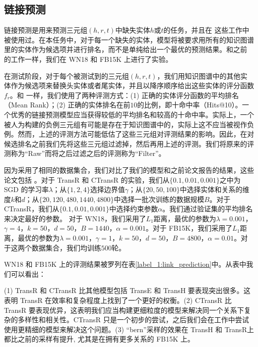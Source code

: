     \subsection{链接预测}
    链接预测是用来预测三元组$(h, r, t)$中缺失实体$h$或$t$的任务，并且在 \cite{bordes2011learning,bordes2012joint,bordes2013translating} 这些工作中被使用过。在本任务中，对于每一个缺失的实体，模型将被要求用所有的知识图谱里的实体作为候选项并进行排名，而不是单纯给出一个最优的预测结果。和之前 \cite{bordes2011learning,bordes2013translating} 的工作一样，我们在 WN18 和 FB15K 上进行了实验。

    在测试阶段，对于每个被测试到的三元组$(h, r, t)$，我们用知识图谱中的其他实体作为候选项来替换头实体或者尾实体，并且以降序顺序给出这些实体的评分函数$f_r$。和 \cite{bordes2013translating} 一样，我们使用了两种评测方式：(1) 正确的实体评分函数的平均排名（Mean Rank）；(2) 正确的实体排名在前$10$的比例，即十命中率（Hits@10）。一个优秀的链接预测模型应当获得较低的平均排名和较高的十命中率。实际上，一个被人为构建的负例三元组有可能是存在于知识图谱中的，实际上这不应当被视作负例。然而，上述的评测方法可能低估了这些三元组对评测结果的影响。因此，在对候选排名之前我们先将这些三元组过滤掉，然后再用上述的评测。我们将原来的评测称为``Raw''而将之后过滤之后的评测称为``Filter''。

    因为采用了相同的数据集合，我们对比了我们的模型和之前论文报告的结果，这些论文包括 \cite{bordes2013translating,wang2014knowledge}。对于 TransR 和 CTransR 的实验，我们从$\{0.1, 0.01, 0.001\}$之中为 SGD 的学习率$\lambda$；从$\{1, 2, 4\}$选择边界值$\gamma$；从$\{20,50,100\}$中选择实体和关系的维度$k$和$d$；从$\{20, 120, 480, 1440, 4800\}$中选择一批次训练的数据规模$B$。对于 CTransR，我们从$\{0.1,0.01,0.001\}$中选择约束参数$\alpha$。我们通过验证集的平均排名来决定最好的参数。
    对于 WN18，我们采用了$L_1$距离，最优的参数为$\lambda = 0.001$，$\gamma= 4$，$k = 50$，$d = 50$，$B = 1440$，$\alpha=0.001$。对于 FB15K，我们采用了$L_1$距离，最优的参数为$\lambda = 0.001$，$\gamma = 1$，$k = 50$，$d = 50$，$B = 4800$，$\alpha=0.01$。对于这两个数据集合，我们均训练$500$轮。

    WN18 和 FB15K 上的评测结果被罗列在表\ref{label_1:link_prediction}中。从表中我们可以看出：


     (1) TransR 和 CTransR 比其他模型包括 TransE 和 TransH 要表现突出很多。这表明 TransR 在效率和复杂程度上找到了一个更好的权衡。(2) CTransR 比 TransR 要表现优异，这表明我们应当构建更细粒度的模型来解决同一个关系下复杂的多样性和相关性。CTransR 只是一个初步的尝试，之后我们会在工作中尝试使用更精细的模型来解决这个问题。(3) ``bern''采样的效果在 TransH 和 TransR上都比之前的采样有提升, 尤其是在拥有更多关系的 FB15K 上。

